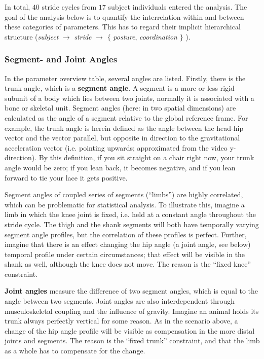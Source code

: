 In total, \(40\) stride cycles from \(17\) subject individuals entered the analysis.
The goal of the analysis below is to quantify the interrelation within and between these categories of parameters.
This has to regard their implicit hierarchical structure (\emph{subject} \(\rightarrow\) \emph{stride} \(\rightarrow\) \(\lbrace\) \emph{posture}, \emph{coordination} \(\rbrace\) ).


\subsubsection{Segment- and Joint Angles}
\label{sec:orgd5b5698}
In the parameter overview table, several angles are listed.
Firstly, there is the trunk angle, which is a \textbf{segment angle}.
A segment is a more or less rigid subunit of a body which lies between two joints, normally it is associated with a bone or skeletal unit.
Segment angles (here: in two spatial dimensions) are calculated as the angle of a segment relative to the global reference frame.
For example, the trunk angle is herein defined as the angle between the head-hip vector and the vector parallel, but opposite in direction to the gravitational acceleration vector (i.e. pointing upwards; approximated from the video y-direction).
By this definition, if you sit straight on a chair right now, your trunk angle would be zero; if you lean back, it becomes negative, and if you lean forward to tie your lace it gets positive.

Segment angles of coupled series of segments (``limbs'') are highly correlated, which can be problematic for statistical analysis.
To illustrate this, imagine a limb in which the knee joint is fixed, i.e. held at a constant angle throughout the stride cycle.
The thigh and the shank segments will both have temporally varying segment angle profiles, but the correlation of these profiles is perfect.
Further, imagine that there is an effect changing the hip angle (a joint angle, see below) temporal profile under certain circumstances; that effect will be visible in the shank as well, although the knee does not move.
The reason is the ``fixed knee'' constraint.

\textbf{Joint angles} measure the difference of two segment angles, which is equal to the angle between two segments.
Joint angles are also interdependent through musculoskeletal coupling and the influence of gravity.
Imagine an animal holds its trunk always perfectly vertical for some reason.
As in the scenario above, a change of the hip angle profile will be visible as compensation in the more distal joints and segments.
The reason is the ``fixed trunk'' constraint, and that the limb as a whole has to compensate for the change.

